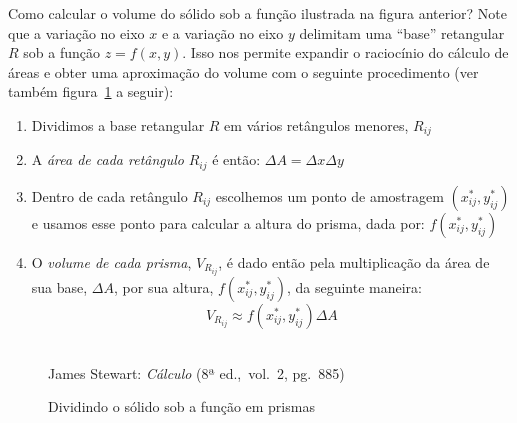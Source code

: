 Como calcular o volume do sólido sob a função ilustrada na figura
anterior? Note que a variação no eixo $x$ e a variação no eixo $y$
delimitam uma ``base'' retangular $R$ sob a função $z = f(x,y)$. Isso
nos permite expandir o raciocínio do cálculo de áreas e obter uma
aproximação do volume com o seguinte procedimento (ver também
figura~\ref{fig:volume2} a seguir):

\begin{enumerate}
  \item Dividimos a base retangular $R$ em vários retângulos menores,
    $R_{ij}$
  \item A \emph{área de cada retângulo} $R_{ij}$ é então: $\Delta A = \Delta
    x \Delta y$    
  \item Dentro de cada retângulo $R_{ij}$ escolhemos um ponto de
    amostragem $(x^*_{ij}, y^*_{ij})$ e usamos esse ponto para
    calcular a altura do prisma, dada por: $f(x^*_{ij}, y^*_{ij})$
  \item O \emph{volume de cada prisma}, $V_{R_{ij}}$, é dado então pela multiplicação da
    área de sua base, $\Delta A$, por sua altura, $f(x^*_{ij},
    y^*_{ij})$, da seguinte maneira:
    \begin{equation}
      V_{R_{ij}} \approx f(x^*_{ij}, y^*_{ij}) \Delta A
    \end{equation}
\end{enumerate}

\begin{figure}[H]
  \begin{center}
    \caption{Dividindo o sólido sob a função em prismas}
    \label{fig:volume2}
    \\
    \footnotesize{James Stewart: \emph{Cálculo} (8ª ed.,\ vol.\ 2,
      pg.\ 885)}
  \end{center}
\end{figure}

